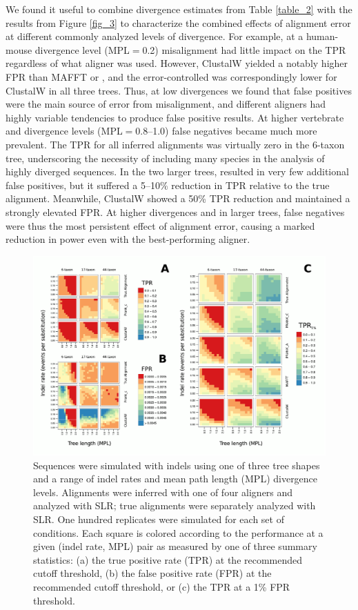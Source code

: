 \documentclass{article}
\begin{document}
We found it useful to combine divergence estimates from Table
\ref{table_2} with the results from Figure \ref{fig_3} to characterize
the combined effects of alignment error at different commonly analyzed
levels of divergence. For example, at a human-mouse divergence level
(MPL$=$0.2) misalignment had little impact on the TPR regardless of
what aligner was used. However, ClustalW yielded a notably higher FPR
than MAFFT or \prankc, and the error-controlled \tpr{} was
correspondingly lower for ClustalW in all three trees. Thus, at low
divergences we found that false positives were the main source of
error from misalignment, and different aligners had highly variable
tendencies to produce false positive results. At higher vertebrate and
\Dr divergence levels (MPL$=$0.8--1.0) false negatives became
much more prevalent. The TPR for all inferred alignments was virtually
zero in the 6-taxon tree, underscoring the necessity of including many
species in the analysis of highly diverged sequences. In the two
larger trees, \prankc resulted in very few additional false
positives, but it suffered a 5--10\% reduction in TPR relative to the
true alignment. Meanwhile, ClustalW showed a 50\% TPR reduction and
maintained a strongly elevated FPR. At higher divergences and in
larger trees, false negatives were thus the most persistent effect of
alignment error, causing a marked reduction in \sw power even with the
best-performing aligner.

\begin{figure}[t]
\begin{center}
\includegraphics[scale=0.8]{fig4.pdf}
\end{center}
\caption{Sequences were simulated with indels using one of three tree
  shapes and a range of indel rates and mean path length (MPL)
  divergence levels. Alignments were inferred with one of four
  aligners and analyzed with SLR; true alignments were separately
  analyzed with SLR. One hundred replicates were simulated for each
  set of conditions. Each square is colored according to the
  performance at a given (indel rate, MPL) pair as measured by one of
  three summary statistics: (a) the true positive rate (TPR) at the
  recommended cutoff threshold, (b) the false positive rate (FPR) at
  the recommended cutoff threshold, or (c) the TPR at a 1\% FPR
  threshold.}
\label{fig_4}
\end{figure}
\end{document}
